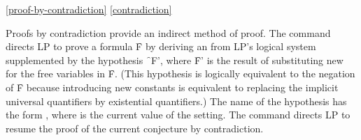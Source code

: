 \ref{proof-by-contradiction}
\ref{contradiction}

Proofs by contradiction provide an indirect method of proof.  The command
 directs LP to prove a formula \f{F} by deriving
an  from LP's logical system supplemented
by the hypothesis \f{~F'}, where \f{F'} is the result of substituting new
 for the free variables in \f{F}.  (This hypothesis
is logically equivalent to the negation of \f{F} because introducing new
constants is equivalent to replacing the implicit universal quantifiers by
existential quantifiers.)  The name of the hypothesis has the form
, where  is the current value
of the  setting.
\p
The command  directs LP to resume the proof of the
current conjecture by contradiction.
